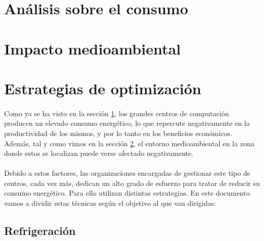 \documentclass[10pt]{article}
\begin{document}
    \section{Análisis sobre el consumo}
    \label{sec:analisis}
    	\paragraph{}


    \section{Impacto medioambiental}
	\label{sec:impacto}

        \paragraph{}


    \section{Estrategias de optimización}
	\label{sec:estrategias}

    	\paragraph{}
		Como ya se ha visto en la sección \ref{sec:analisis}, los grandes centros de computación producen un elevado consumo energético, lo que repercute negativamente en la productividad de los mismos, y por lo tanto en los beneficios económicos. Además, tal y como vimos en la sección \ref{sec:impacto}, el entorno medioambiental en la zona donde estos se localizan puede verse afectado negativamente.


		\paragraph{}
		Debido a estos factores, las organizaciones encargadas de gestionar este tipo de centros, cada vez más, dedican un alto grado de esfuerzo para tratar de reducir su consumo energético. Para ello utilizan distintas estrategias. En este documento vamos a dividir estas técnicas según el objetivo al que van dirigidas:


		\subsection{Refrigeración}

			\paragraph{}
\end{document}

